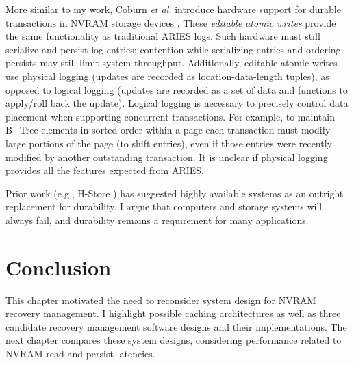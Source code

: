 More similar to my work, Coburn \emph{et al.} introduce hardware support for durable transactions in NVRAM storage devices \cite{Coburn13}.
These \emph{editable atomic writes} provide the same functionality as traditional ARIES logs.
Such hardware must still serialize and persist log entries; contention while serializing entries and ordering persists may still limit system throughput.
Additionally, editable atomic writes use physical logging (updates are recorded as location-data-length tuples), as opposed to logical logging (updates are recorded as a set of data and functions to apply/roll back the update).
Logical logging is necessary to precisely control data placement when supporting concurrent transactions.
For example, to maintain B+Tree elements in sorted order within a page each transaction must modify large portions of the page (to shift entries), even if those entries were recently modified by another outstanding transaction.
It is unclear if physical logging provides all the features expected from ARIES.


Prior work (e.g., H-Store \cite{StonebrakerMadden07}) has suggested highly available systems as an outright replacement for durability.
I argue that computers and storage systems will always fail, and durability remains a requirement for many applications.

\section{Conclusion}
\label{sec:OLTP_design:Conclusion}
This chapter motivated the need to reconsider system design for NVRAM recovery management.
I highlight possible caching architectures as well as three candidate recovery management software designs and their implementations.
The next chapter compares these system designs, considering performance related to NVRAM read and persist latencies.
